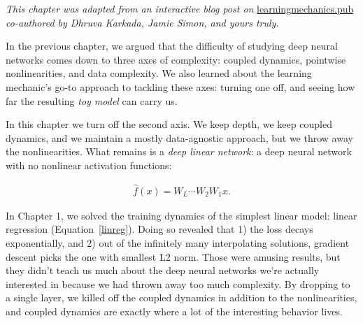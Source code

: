 \textit{This chapter was adapted from an interactive blog post on}
\href{https://learningmechanics.pub/deep-linear-nets/}{learningmechanics.pub}
\textit{co-authored by Dhruva Karkada, Jamie Simon, and yours truly.}

\bigskip

In the previous chapter, we argued that the difficulty of studying deep neural networks comes down to three axes of complexity: coupled dynamics, pointwise nonlinearities, and data complexity. We also learned about the learning mechanic's go-to approach to tackling these axes: turning one off, and seeing how far the resulting \textit{toy model} can carry us.

In this chapter we turn off the second axis. We keep depth, we keep coupled dynamics, and we maintain a mostly data-agnostic approach, but we throw away the nonlinearities. What remains is a \emph{deep linear network}: a deep neural network with no nonlinear activation functions:

\begin{align*}
    \hat{f}(x) = W_L \cdots W_2 W_1 x.
\end{align*}

In Chapter 1, we solved the training dynamics of the simplest linear model: linear regression (Equation~\eqref{linreg}). Doing so revealed that 1) the loss decays exponentially, and 2) out of the infinitely many interpolating solutions, gradient descent picks the one with smallest L2 norm. Those were amusing results, but they didn't teach us much about the deep neural networks we're actually interested in because we had thrown away too much complexity. By dropping to a single layer, we killed off the coupled dynamics in addition to the nonlinearities, and coupled dynamics are exactly where a lot of the interesting behavior lives.

